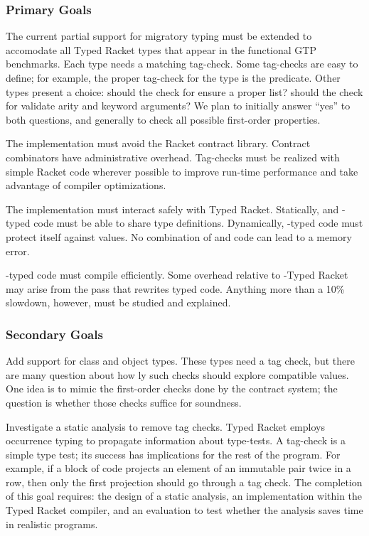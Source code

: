 \subsubsection{Primary Goals}

The current partial support for \tshallow{} migratory typing must be extended to accomodate all Typed Racket types
 that appear in the functional GTP benchmarks.
Each type needs a matching tag-check.
Some tag-checks are easy to define; for example, the proper tag-check for the  type is the  predicate.
Other types present a choice:
 should the check for  ensure a proper list?
 should the check for \racketcode{->*} validate arity and keyword arguments?
We plan to initially answer ``yes'' to both questions, and generally to check
 all possible first-order properties.

The implementation must avoid the Racket contract library.
Contract combinators have administrative overhead.
Tag-checks must be realized with simple Racket code wherever possible to
improve run-time performance and take advantage of compiler optimizations.

The implementation must interact safely with Typed Racket.
Statically, \tshallow{} and \tdeep{}-typed code must be able to share type definitions.
Dynamically, \tdeep{}-typed code must protect itself against \tshallow{} values.
No combination of \tdeep{} and \tshallow{} code can lead to a memory error.

\tShallow{}-typed code must compile efficiently.
Some overhead relative to \tdeep{}-Typed Racket may arise from the pass that
rewrites typed code.
Anything more than a 10\% slowdown, however, must be studied and explained.


\subsubsection{Secondary Goals}

Add support for class and object types.
These types need a tag check, but there are many question about how \tdeep{}ly such
 checks should explore compatible values.
One idea is to mimic the first-order checks done by the contract system;
 the question is whether those checks suffice for soundness.

Investigate a static analysis to remove tag checks.
Typed Racket employs occurrence typing to propagate information about type-tests.
A tag-check is a simple type test; its success has implications for the rest of
the program.
For example, if a block of code projects an element of an immutable pair twice in a row,
 then only the first projection should go through a tag check.
The completion of this goal requires: the design of a static analysis,
 an implementation within the Typed Racket compiler,
 and an evaluation to test whether the analysis saves time in realistic programs.

